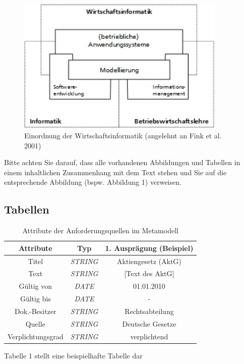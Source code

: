 \begin{figure}[h]
\begin{center}

\includegraphics[width=10cm]{images/Abb2_3.png}
\caption{Einordnung der Wirtschaftsinformatik (angelehnt an Fink et al. 2001)}
\label{Abbildung2_3}
\end{center}
\end{figure}
Bitte achten Sie darauf, dass alle vorhandenen Abbildungen und Tabellen in einem inhaltlichen Zusammenhang mit dem Text stehen und Sie auf die entsprechende Abbildung (bspw. Abbildung 1) verweisen.
\subsection{Tabellen}
\begin{table}[h]
\centering
\begin{tabular}{ccc}
\hline \textbf{Attribute} &\textbf{Typ}  & \textbf{1. Ausprägung (Beispiel)} \\ 
\hline Titel & \textit{STRING}& Aktiengesetz (AktG)  \\ 
Text& \textit{STRING} &  [Text des AktG]\\ 
Gültig von & \textit{DATE} & 01.01.2010 \\ 
Gültig bis & \textit{DATE} & - \\ 
Dok.-Besitzer & \textit{STRING} & Rechtsabteilung \\ 
Quelle & \textit{STRING}  & Deutsche Gesetze \\ 
Verplichtungsgrad & \textit{STRING} & verplichtend \\ 
\hline 
\end{tabular} 
\caption{Attribute der Anforderungsquellen im Metamodell}
\label{tab:tabelle 1}
\end{table}
\par\medskip

Tabelle 1 stellt eine beispielhafte Tabelle dar